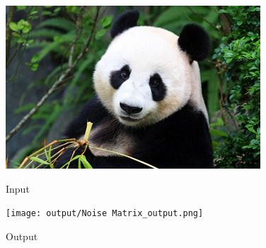 \documentclass[a4paper,8pt]{article}
\begin{document}
        \begin{figure}[H]
        \centering
        \begin{minipage}{0.4\linewidth}
        \centering
        \includegraphics[width=\linewidth]{output/input1.jpg}
        \caption{Input}
        \end{minipage}
        \hfill
        \begin{minipage}{0.4\linewidth}
        \centering
        \texttt{[image: output/Noise Matrix\_output.png]}
        \caption{Output}
        \end{minipage}
        \end{figure}
        \clearpage
        
\end{document}
